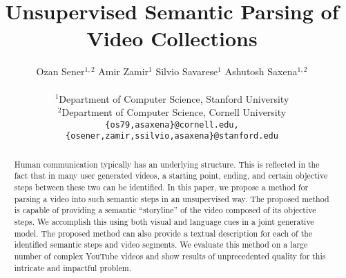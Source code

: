 \documentclass[10pt,twocolumn,letterpaper]{article}
\begin{document}
\title{Unsupervised Semantic Parsing of Video Collections}



\author{ Ozan Sener$^{1,2}$ \;\; Amir Zamir$^{1}$ \;\; Silvio Savarese$^{1}$ \;\; Ashutosh Saxena$^{1,2}$  \\ \\
$^1$Department of Computer Science, Stanford University\\
$^2$Department of Computer Science, Cornell University\\
{\tt\small \{os79,asaxena\}@cornell.edu, \{osener,zamir,ssilvio,asaxena\}@stanford.edu}
}
\maketitle


\begin{spacing}{0.98}
\begin{abstract}
    Human communication \cite{ivannew}typically has an underlying structure. This is reflected in the fact that in many user generated videos, a starting point, ending, and certain objective steps between these two can be identified. In this paper, we propose a method for parsing a video into such semantic steps in an unsupervised way. The proposed method is capable of providing a semantic ``storyline'' of the video composed of its objective steps. We accomplish this using both visual and language cues in a joint generative model. The proposed method can also provide a textual description for each of the identified semantic steps and video segments. We evaluate this method on a large number of complex YouTube videos and show results of unprecedented quality for this intricate and impactful problem.
\end{abstract}
\vspace{-5mm}







%
\end{spacing}
{\footnotesize


}
\end{document}
